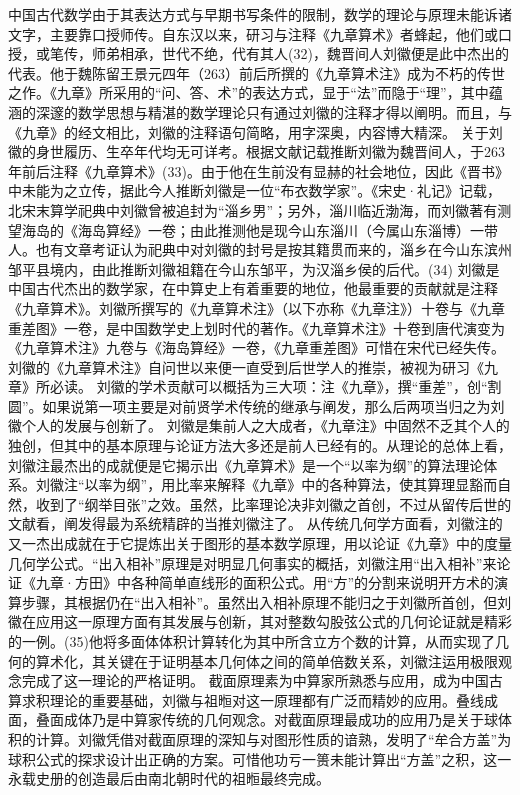 \documentclass[a4paper,12pt,UTF8,twoside]{ctexbook}
\begin{document}
中国古代数学由于其表达方式与早期书写条件的限制，数学的理论与原理未能诉诸文字，主要靠口授师传。自东汉以来，研习与注释《九章算术》者蜂起，他们或口授，或笔传，师弟相承，世代不绝，代有其人(32)，魏晋间人刘徽便是此中杰出的代表。他于魏陈留王景元四年（263）前后所撰的《九章算术注》成为不朽的传世之作。《九章》所采用的“问、答、术”的表达方式，显于“法”而隐于“理”，其中蕴涵的深邃的数学思想与精湛的数学理论只有通过刘徽的注释才得以阐明。而且，与《九章》的经文相比，刘徽的注释语句简略，用字深奥，内容博大精深。
关于刘徽的身世履历、生卒年代均无可详考。根据文献记载推断刘徽为魏晋间人，于263年前后注释《九章算术》(33)。由于他在生前没有显赫的社会地位，因此《晋书》中未能为之立传，据此今人推断刘徽是一位“布衣数学家”。《宋史·礼记》记载，北宋末算学祀典中刘徽曾被追封为“淄乡男”；另外，淄川临近渤海，而刘徽著有测望海岛的《海岛算经》一卷；由此推测他是现今山东淄川（今属山东淄博）一带人。也有文章考证认为祀典中对刘徽的封号是按其籍贯而来的，淄乡在今山东滨州邹平县境内，由此推断刘徽祖籍在今山东邹平，为汉淄乡侯的后代。(34)
刘徽是中国古代杰出的数学家，在中算史上有着重要的地位，他最重要的贡献就是注释《九章算术》。刘徽所撰写的《九章算术注》（以下亦称《九章注》）十卷与《九章重差图》一卷，是中国数学史上划时代的著作。《九章算术注》十卷到唐代演变为《九章算术注》九卷与《海岛算经》一卷，《九章重差图》可惜在宋代已经失传。刘徽的《九章算术注》自问世以来便一直受到后世学人的推崇，被视为研习《九章》所必读。
刘徽的学术贡献可以概括为三大项：注《九章》，撰“重差”，创“割圆”。如果说第一项主要是对前贤学术传统的继承与阐发，那么后两项当归之为刘徽个人的发展与创新了。
刘徽是集前人之大成者，《九章注》中固然不乏其个人的独创，但其中的基本原理与论证方法大多还是前人已经有的。从理论的总体上看，刘徽注最杰出的成就便是它揭示出《九章算术》是一个“以率为纲”的算法理论体系。刘徽注“以率为纲”，用比率来解释《九章》中的各种算法，使其算理显豁而自然，收到了“纲举目张”之效。虽然，比率理论决非刘徽之首创，不过从留传后世的文献看，阐发得最为系统精辟的当推刘徽注了。
从传统几何学方面看，刘徽注的又一杰出成就在于它提炼出关于图形的基本数学原理，用以论证《九章》中的度量几何学公式。“出入相补”原理是对明显几何事实的概括，刘徽注用“出入相补”来论证《九章·方田》中各种简单直线形的面积公式。用“方”的分割来说明开方术的演算步骤，其根据仍在“出入相补”。虽然出入相补原理不能归之于刘徽所首创，但刘徽在应用这一原理方面有其发展与创新，其对整数勾股弦公式的几何论证就是精彩的一例。(35)他将多面体体积计算转化为其中所含立方个数的计算，从而实现了几何的算术化，其关键在于证明基本几何体之间的简单倍数关系，刘徽注运用极限观念完成了这一理论的严格证明。
截面原理素为中算家所熟悉与应用，成为中国古算求积理论的重要基础，刘徽与祖暅对这一原理都有广泛而精妙的应用。叠线成面，叠面成体乃是中算家传统的几何观念。对截面原理最成功的应用乃是关于球体积的计算。刘徽凭借对截面原理的深知与对图形性质的谙熟，发明了“牟合方盖”为球积公式的探求设计出正确的方案。可惜他功亏一篑未能计算出“方盖”之积，这一永载史册的创造最后由南北朝时代的祖暅最终完成。
\end{document}
